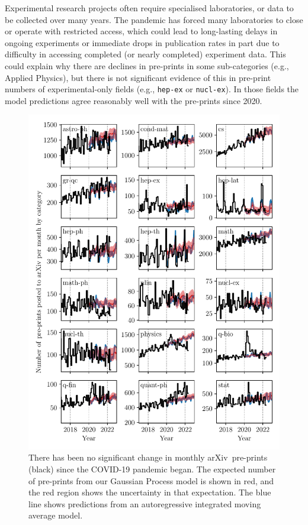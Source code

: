 \documentclass[]{rsos}%
\newcommand{\arxiv}{arXiv}
\begin{document}
Experimental research projects often require specialised laboratories, or data to be collected over many years. The pandemic has forced many laboratories to close or operate with restricted access\cite{PhysicsWorld,ScienceMag,Castelvecchi}, which could lead to long-lasting delays in ongoing experiments or immediate drops in publication rates in part due to difficulty in accessing completed (or nearly completed) experiment data. This could explain why there are declines in pre-prints in some sub-categories (e.g., Applied Physics), but there is not significant evidence of this in pre-print numbers of experimental-only fields (e.g., \texttt{hep-ex} or \texttt{nucl-ex}). In those fields the model predictions agree reasonably well with the pre-prints since 2020.




\begin{figure}[!h]
\includegraphics[width=0.95\linewidth]{pre-prints-segmented-by-field}
\caption{There has been no significant change in monthly \arxiv\ pre-prints (black) since the COVID-19 pandemic began. The expected number of pre-prints from our Gaussian Process model is shown in red, and the red region shows the uncertainty in that expectation. The blue line shows predictions from an autoregressive integrated moving average model.}
\label{fig:1}
\end{figure}
\end{document}
